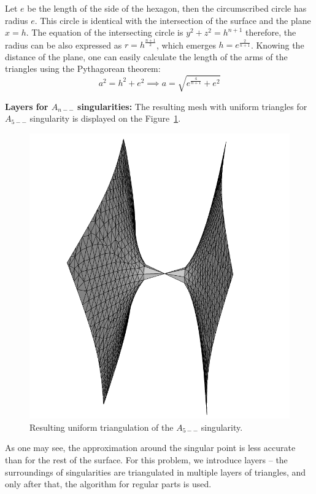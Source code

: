 Let $e$ be the length of the side of the hexagon, then the circumscribed
circle has radius $e$. This circle is identical with the intersection of
the surface and the plane $x=h$. The equation of the intersecting circle
is $y^2+z^2=h^{n+1}$ therefore, the radius can be also expressed as 
$r=h^{\frac{n+1}{2}}$, which emerges $h=e^{\frac{2}{n+1}}$. Knowing the
distance of the plane, one can easily calculate the length of the arms of
the triangles using the Pythagorean theorem: 
$$a^2=h^2+e^2 \implies a = \sqrt{e^{\frac{4}{n+1}} + e^2}$$

\textbf{Layers for $A_{n--}$ singularities:}
The resulting mesh with uniform triangles for $A_{5--}$ singularity is displayed
on the Figure~\ref{img:A5-uniform}.  

\begin{figure}
    \centerline{\includegraphics[scale=0.25]{images/A5-uniform}}
    \caption[Resulting uniform triangulation of the $A_{5--}$ singularity]
    {Resulting uniform triangulation of the $A_{5--}$ singularity.}
    \label{img:A5-uniform}
\end{figure}

As one may see, the approximation around the singular
point is less accurate than for the rest of the surface.
For this problem, we introduce layers -- the surroundings of singularities are
triangulated in multiple layers of triangles, and only after that, the algorithm for
regular parts is used.

